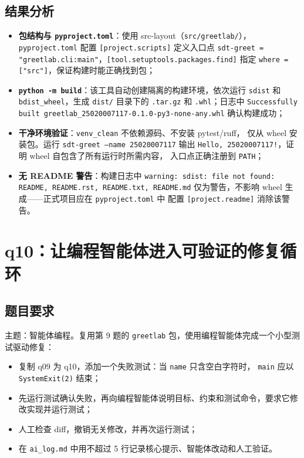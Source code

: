\documentclass[a4paper,11pt]{ctexart}
\begin{document}
\subsection{结果分析}

\begin{itemize}
  \item \textbf{包结构与 \texttt{pyproject.toml}}：使用 src-layout（\texttt{src/greetlab/}），
        \texttt{pyproject.toml} 配置 \texttt{[project.scripts]} 定义入口点
        \texttt{sdt-greet = "greetlab.cli:main"}，\texttt{[tool.setuptools.packages.find]} 指定
        \texttt{where = ["src"]}，保证构建时能正确找到包；
  \item \textbf{\texttt{python -m build}}：该工具自动创建隔离的构建环境，依次运行
        \texttt{sdist} 和 \texttt{bdist\_wheel}，生成 \texttt{dist/} 目录下的
        \texttt{.tar.gz} 和 \texttt{.whl}；日志中
        \texttt{Successfully built greetlab\_25020007117-0.1.0-py3-none-any.whl} 确认构建成功；
  \item \textbf{干净环境验证}：\texttt{venv\_clean} 不依赖源码、不安装 pytest/ruff，
        仅从 wheel 安装包。运行 \texttt{sdt-greet --name 25020007117} 输出
        \texttt{Hello, 25020007117!}，证明 wheel 自包含了所有运行时所需内容，
        入口点正确注册到 \texttt{PATH}；
  \item \textbf{无 README 警告}：构建日志中
        \texttt{warning: sdist: file not found: README, README.rst, README.txt, README.md}
        仅为警告，不影响 wheel 生成——正式项目应在 \texttt{pyproject.toml} 中
        配置 \texttt{[project.readme]} 消除该警告。
\end{itemize}

\section{q10：让编程智能体进入可验证的修复循环}

\subsection{题目要求}

主题：智能体编程。复用第 9 题的 \texttt{greetlab} 包，使用编程智能体完成一个小型测试驱动修复：
\begin{itemize}
  \item 复制 q09 为 q10，添加一个失败测试：当 \texttt{name} 只含空白字符时，
        \texttt{main} 应以 \texttt{SystemExit(2)} 结束；
  \item 先运行测试确认失败，再向编程智能体说明目标、约束和测试命令，要求它修改实现并运行测试；
  \item 人工检查 diff，撤销无关修改，并再次运行测试；
  \item 在 \texttt{ai\_log.md} 中用不超过 5 行记录核心提示、智能体改动和人工验证。
\end{itemize}
\end{document}
